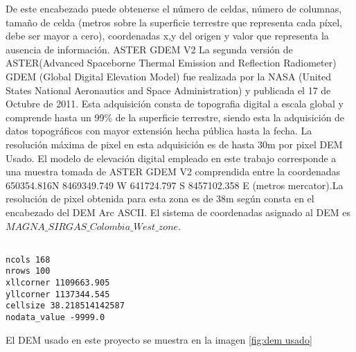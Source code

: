 De este encabezado puede obtenerse el n\'{u}mero de celdas, n\'{u}mero de columnas, tama\~{n}o de celda (metros
sobre la superficie terrestre que representa cada p\'{i}xel, debe ser mayor a cero),
coordenadas x,y del origen y valor que representa la ausencia de informaci\'{o}n.
ASTER GDEM V2
La segunda versi\'{o}n de ASTER(Advanced Spaceborne Thermal Emission and Reflection
Radiometer) GDEM (Global Digital Elevation Model) fue realizada por la NASA (United
States National Aeronautics and Space Administration) y publicada el 17 de Octubre de
2011. Esta adquisici\'{o}n consta de topografia digital a escala global y comprende hasta un
99\% de la superficie terrestre, siendo esta la adquisici\'{o}n de datos topogr\'{a}ficos con mayor
extensi\'{o}n hecha p\'{u}blica hasta la fecha.
La resoluci\'{o}n m\'{a}xima de pixel en esta adquisici\'{o}n es de hasta 30m por pixel
DEM Usado.
El modelo de elevaci\'{o}n digital empleado en este trabajo corresponde a una muestra tomada
de ASTER GDEM V2 comprendida entre la coordenadas 650354.816N 8469349.749 W
641724.797 S 8457102.358 E (metros mercator).La resoluci\'{o}n de pixel obtenida para esta
zona es de 38m seg\'{u}n consta en el encabezado del DEM Arc ASCII. El sistema de
coordenadas asignado al DEM es $ MAGNA\_SIRGAS\_Colombia\_West\_zone$.\par

\begin{lstlisting}

ncols 168
nrows 100
xllcorner 1109663.905
yllcorner 1137344.545
cellsize 38.218514142587
nodata_value -9999.0
\end{lstlisting}

El DEM usado en este proyecto se muestra en la imagen \ref{fig:dem usado}